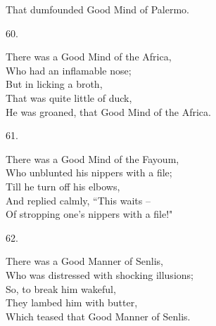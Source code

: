 \documentclass{book}
\begin{document}
{\hspace*{14mm}       That dumfounded Good Mind of Palermo.
\begin{center}
    60.
\end{center}
\par
\noindent
\hspace*{14mm}       There was a Good Mind of the Africa, \\
\hspace*{14mm}       Who had an inflamable nose; \\
\hspace*{14mm}       But in licking a broth, \\
\hspace*{14mm}       That was quite little of duck, \\
\hspace*{14mm}       He was groaned, that Good Mind of the Africa.
\begin{center}
    61.
\end{center}
\par
\noindent
\hspace*{14mm}       There was a Good Mind of the Fayoum, \\
\hspace*{14mm}       Who unblunted his nippers with a file; \\
\hspace*{14mm}       Till he turn off his elbows, \\
\hspace*{14mm}       And replied calmly, ``This waits --  \\
\hspace*{14mm}       Of stropping one's nippers with a file!"
\begin{center}
    62.
\end{center}
\par
\noindent
\hspace*{14mm}       There was a Good Manner of Senlis, \\
\hspace*{14mm}       Who was distressed with shocking illusions; \\
\hspace*{14mm}       So, to break him wakeful, \\
\hspace*{14mm}       They lambed him with butter, \\
\hspace*{14mm}       Which teased that Good Manner of Senlis.
\begin{center}

\end{center}}
\end{document}
